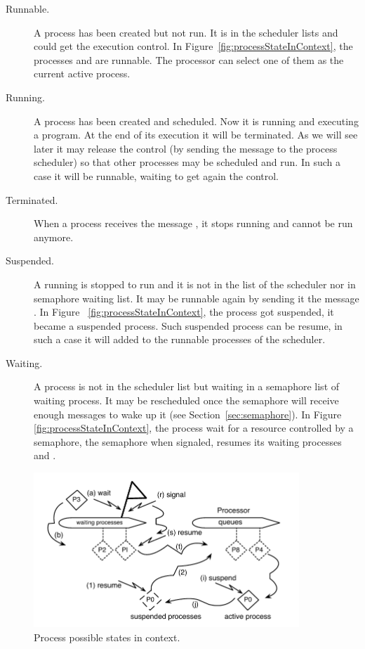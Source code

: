 \documentclass[a4paper,10pt,twoside]{book}
\begin{document}
\begin{description}
\item [Runnable.] A process has been created but not run. It is in the scheduler lists and could get the execution control. In Figure~\ref{fig:processStateInContext}, the processes  and  are runnable. The processor can select one of them as the current active process. 

\item [Running.] A process has been created and scheduled. Now it is running and executing a program. At the end of its execution it will be terminated. As we will see later it may release  the control (by sending the message  to  the process scheduler) so that other processes may be scheduled and run.  In such a case it will be runnable, \ie waiting to get again the control. 

\item [Terminated.] When a process receives the message , it stops running and cannot be run anymore. 

\item [Suspended.] A running is stopped to run and it is not in the list of the scheduler nor in semaphore waiting list. It may be runnable again by sending it the message . In Figure~
\ref{fig:processStateInContext}, the process  got suspended, it became a suspended process. Such suspended process can be resume, in such a case it will added to the runnable processes of the scheduler. 

\item [Waiting.] A process is not in the scheduler list but waiting in a semaphore list of waiting process. It may be rescheduled once the semaphore will receive enough messages  to wake up it (see Section~\ref{sec:semaphore}). In Figure~
\ref{fig:processStateInContext}, the process  wait for a resource controlled by a semaphore, the semaphore when signaled, resumes its waiting processes  and . 
\end{description}

\begin{figure}
\begin{center}
\includegraphics[width=10cm]{ProcessStateInContext}
\caption{Process possible states in context.}
\end{center}
\end{figure}
\end{document}
